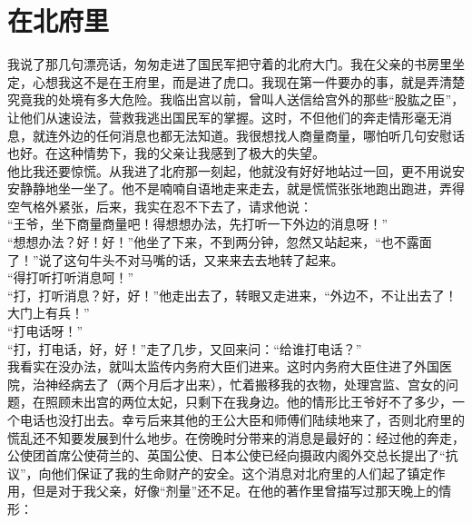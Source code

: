 \fancyhead[RO]{} %
\fancyhead[LE]{} %
\chapter*{在北府里}
\thispagestyle{empty}
我说了那几句漂亮话，匆匆走进了国民军把守着的北府大门。我在父亲的书房里坐定，心想我这不是在王府里，而是进了虎口。我现在第一件要办的事，就是弄清楚究竟我的处境有多大危险。我临出宫以前，曾叫人送信给宫外的那些“股肱之臣”，让他们从速设法，营救我逃出国民军的掌握。这时，不但他们的奔走情形毫无消息，就连外边的任何消息也都无法知道。我很想找人商量商量，哪怕听几句安慰话也好。在这种情势下，我的父亲让我感到了极大的失望。\\

他比我还要惊慌。从我进了北府那一刻起，他就没有好好地站过一回，更不用说安安静静地坐一坐了。他不是喃喃自语地走来走去，就是慌慌张张地跑出跑进，弄得空气格外紧张，后来，我实在忍不下去了，请求他说：\\

“王爷，坐下商量商量吧！得想想办法，先打听一下外边的消息呀！”\\

“想想办法？好！好！”他坐了下来，不到两分钟，忽然又站起来，“也不露面了！”说了这句牛头不对马嘴的话，又来来去去地转了起来。\\

“得打听打听消息呵！”\\

“打，打听消息？好，好！”他走出去了，转眼又走进来，“外边不，不让出去了！大门上有兵！”\\

“打电话呀！”\\

“打，打电话，好，好！”走了几步，又回来问：“给谁打电话？”\\

我看实在没办法，就叫太监传内务府大臣们进来。这时内务府大臣住进了外国医院，治神经病去了（两个月后才出来），忙着搬移我的衣物，处理宫监、宫女的问题，在照顾未出宫的两位太妃，只剩下在我身边。他的情形比王爷好不了多少，一个电话也没打出去。幸亏后来其他的王公大臣和师傅们陆续地来了，否则北府里的慌乱还不知要发展到什么地步。在傍晚时分带来的消息是最好的：经过他的奔走，公使团首席公使荷兰的、英国公使、日本公使已经向摄政内阁外交总长提出了“抗议”，向他们保证了我的生命财产的安全。这个消息对北府里的人们起了镇定作用，但是对于我父亲，好像“剂量”还不足。在他的著作里曾描写过那天晚上的情形：\\

